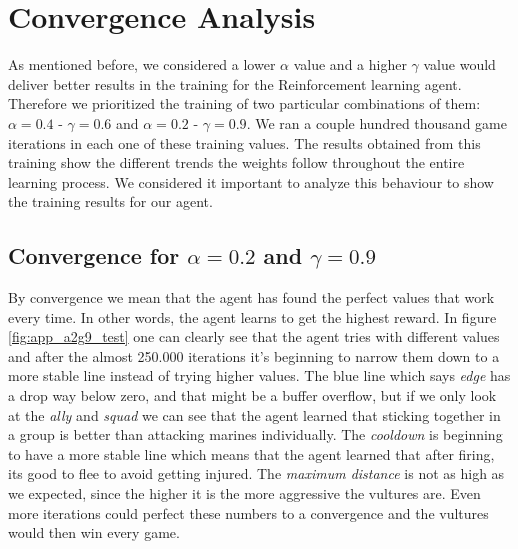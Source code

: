 \section{Convergence Analysis}

As mentioned before, we considered a lower $\alpha$ value and a higher $\gamma$ value would deliver better results in the training for the Reinforcement learning agent. Therefore we prioritized the training of two particular combinations of them: $\alpha= 0.4$ - $\gamma = 0.6$ and $\alpha= 0.2$ - $\gamma = 0.9$. We ran a couple hundred thousand game iterations in each one of these training values. The results obtained from this training show the different trends the weights follow throughout the entire learning process. We considered it important to analyze this behaviour to show the training results for our agent. \\


\subsection*{Convergence for $\alpha= 0.2$ and $\gamma = 0.9$}

By convergence we mean that the agent has found the perfect values that work every time. In other words, the agent learns to get the highest reward. In figure \ref{fig:app_a2g9_test} one can clearly see that the agent tries with different values and after the almost 250.000 iterations it's beginning to narrow them down to a more stable line instead of trying higher values. The blue line which says \textit{edge} has a drop way below zero, and that might be a buffer overflow, but if we only look at the \textit{ally} and \textit{squad} we can see that the agent learned that sticking together in a group is better than attacking marines individually. The \textit{cooldown} is beginning to have a more stable line which means that the agent learned that after firing, its good to flee to avoid getting injured. The \textit{maximum distance} is not as high as we expected, since the higher it is the more aggressive the vultures are. Even more iterations could perfect these numbers to a convergence and the vultures would then win every game. 


